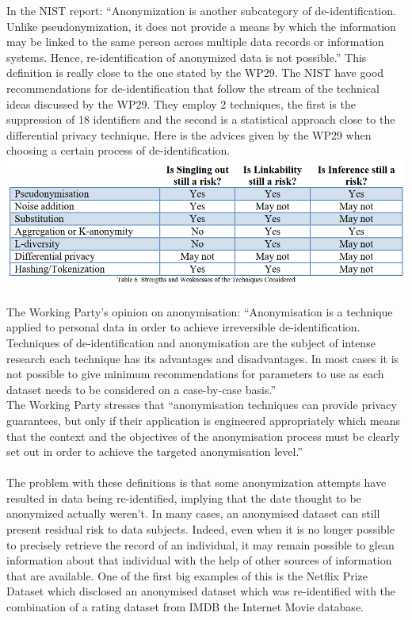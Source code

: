 \documentclass[9pt]{article}
\begin{document}
In the NIST report: \enquote{Anonymization is another subcategory of de-identification. Unlike pseudonymization, it does not provide a means by which the information may be linked to the same person across multiple data records or information systems. Hence, re-identification of anonymized data is not possible.}\cite{NIST:2015} This definition is really close to the one stated by the WP29. The NIST have good recommendations for de-identification that follow the stream of the technical ideas discussed by the WP29. They employ 2 techniques, the first is the suppression of 18 identifiers and the second is a statistical approach close to the differential privacy technique. Here is the advices given by the WP29 when choosing a certain process of de-identification.
\includegraphics[scale=0.55]{techniques.png}
\cite{WP29:2007}\\\\
The Working Party's opinion on anonymisation: \enquote{Anonymisation is a technique applied to personal data in order to achieve irreversible de-identification.\\
Techniques of de-identification and anonymisation are the subject of intense research each technique has its advantages and disadvantages. In most cases it is not possible to give minimum recommendations for parameters to use as each 
dataset needs to be considered on a case-by-case basis.}\\
The Working Party stresses that \enquote{anonymisation techniques can provide privacy guarantees, but only if their application is engineered appropriately which means that the context and the objectives of the anonymisation process must be clearly set out in order to achieve the targeted anonymisation level.}\cite{WP29:2007}\\\\
The problem with these definitions is that some anonymization attempts have resulted in data being re-identified, implying that the date thought to be anonymized actually weren’t.\cite{ICO:PD}
In many cases, an anonymised dataset can still present residual risk to data subjects. Indeed, even when it is no  longer possible to precisely retrieve the record of an  individual, it may remain possible to glean information about  that individual with the help of other sources of information that are available\cite{WP29:2007}. One of the first big examples of this is the Netflix Prize Dataset\cite{Netflix} which disclosed an anonymised dataset which was re-identified with the combination of a rating dataset from IMDB the Internet Movie database.\\\\
\end{document}
